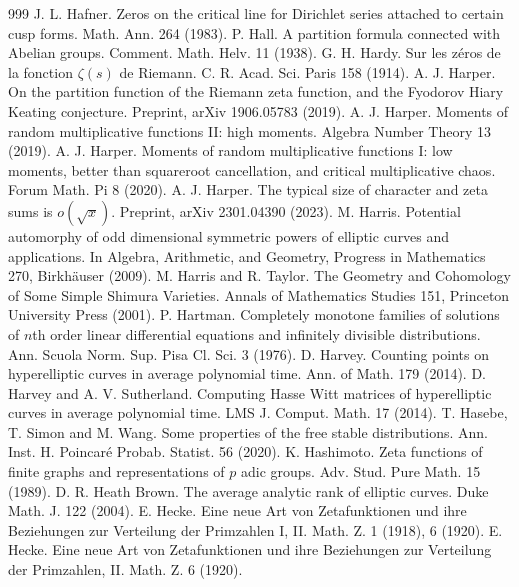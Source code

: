 \begin{thebibliography}{999}
 J. L. Hafner. Zeros on the critical line for Dirichlet series attached to certain cusp forms. Math. Ann. 264 (1983).
 P. Hall. A partition formula connected with Abelian groups. Comment. Math. Helv. 11 (1938).
 G. H. Hardy. Sur les z\'eros de la fonction $\zeta(s)$ de Riemann. C. R. Acad. Sci. Paris 158 (1914).
 A. J. Harper. On the partition function of the Riemann zeta function, and the Fyodorov Hiary Keating conjecture. Preprint, arXiv 1906.05783 (2019).
 A. J. Harper. Moments of random multiplicative functions II: high moments. Algebra Number Theory 13 (2019).
 A. J. Harper. Moments of random multiplicative functions I: low moments, better than squareroot cancellation, and critical multiplicative chaos. Forum Math. Pi 8 (2020).
 A. J. Harper. The typical size of character and zeta sums is $o(\sqrt x)$. Preprint, arXiv 2301.04390 (2023).
 M. Harris. Potential automorphy of odd dimensional symmetric powers of elliptic curves and applications. In Algebra, Arithmetic, and Geometry, Progress in Mathematics 270, Birkh\"auser (2009).
 M. Harris and R. Taylor. The Geometry and Cohomology of Some Simple Shimura Varieties. Annals of Mathematics Studies 151, Princeton University Press (2001).
 P. Hartman. Completely monotone families of solutions of $n$th order linear differential equations and infinitely divisible distributions. Ann. Scuola Norm. Sup. Pisa Cl. Sci. 3 (1976).
 D. Harvey. Counting points on hyperelliptic curves in average polynomial time. Ann. of Math. 179 (2014).
 D. Harvey and A. V. Sutherland. Computing Hasse Witt matrices of hyperelliptic curves in average polynomial time. LMS J. Comput. Math. 17 (2014).
 T. Hasebe, T. Simon and M. Wang. Some properties of the free stable distributions. Ann. Inst. H. Poincar\'e Probab. Statist. 56 (2020).
 K. Hashimoto. Zeta functions of finite graphs and representations of $p$ adic groups. Adv. Stud. Pure Math. 15 (1989).
 D. R. Heath Brown. The average analytic rank of elliptic curves. Duke Math. J. 122 (2004).
 E. Hecke. Eine neue Art von Zetafunktionen und ihre Beziehungen zur Verteilung der Primzahlen I, II. Math. Z. 1 (1918), 6 (1920).
 E. Hecke. Eine neue Art von Zetafunktionen und ihre Beziehungen zur Verteilung der Primzahlen, II. Math. Z. 6 (1920).

\end{thebibliography}
